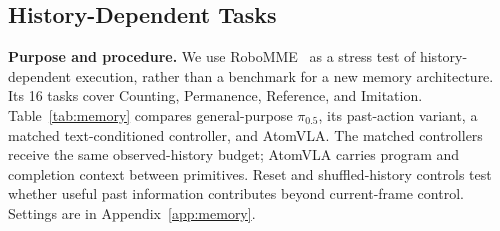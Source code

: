 \subsection{History-Dependent Tasks}
\label{sec:memory}
\textbf{Purpose and procedure.} We use RoboMME~\cite{robomme} as a stress test of history-dependent execution, rather than a benchmark for a new memory architecture. Its 16 tasks cover Counting, Permanence, Reference, and Imitation. Table~\ref{tab:memory} compares general-purpose $\pi_{0.5}$, its past-action variant, a matched text-conditioned controller, and AtomVLA. The matched controllers receive the same observed-history budget; AtomVLA carries program and completion context between primitives. Reset and shuffled-history controls test whether useful past information contributes beyond current-frame control. Settings are in Appendix~\ref{app:memory}.

